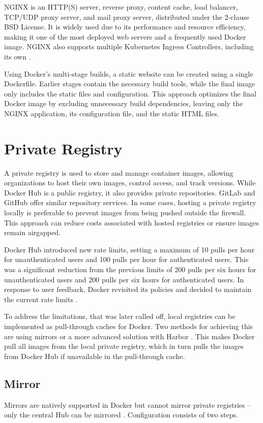 NGINX is an HTTP(S) server, reverse proxy, content cache, load balancer, TCP/UDP proxy server, and mail proxy server, distributed under the 2-clause BSD License. It is widely used due to its performance and resource efficiency, making it one of the most deployed web servers and a frequently used Docker image. NGINX also supports multiple Kubernetes Ingress Controllers, including its own \cite{NginxWebsite}. 

Using Docker's multi-stage builds, a static website can be created using a single Dockerfile. Earlier stages contain the necessary build tools, while the final image only includes the static files and configuration. This approach optimizes the final Docker image by excluding unnecessary build dependencies, leaving only the NGINX application, its configuration file, and the static HTML files.

\section{Private Registry}\label{sec:private_registry}
A private registry is used to store and manage container images, allowing organizations to host their own images, control access, and track versions. While Docker Hub is a public registry, it also provides private repositories. GitLab and GitHub offer similar repository services. In some cases, hosting a private registry locally is preferable to prevent images from being pushed outside the firewall. This approach can reduce costs associated with hosted registries or ensure images remain airgapped.

Docker Hub introduced new rate limits, setting a maximum of 10 pulls per hour for unauthenticated users and 100 pulls per hour for authenticated users. This was a significant reduction from the previous limits of 200 pulls per six hours for unauthenticated users and 200 pulls per six hours for authenticated users. In response to user feedback, Docker revisited its policies and decided to maintain the current rate limits \cite{DockerHubPolicies}.

To address the limitations, that was later called off, local registries can be implemented as pull-through caches for Docker. Two methods for achieving this are using mirrors \cite{dockerhubmirror} or a more advanced solution with Harbor \cite{harbor}. This makes Docker pull all images from the local private registry, which in turn pulls the images from Docker Hub if unavailable in the pull-through cache.

\subsection{Mirror}
Mirrors are natively supported in Docker but cannot mirror private registries -- only the central Hub can be mirrored \cite{dockerhubmirror}. Configuration consists of two steps.

